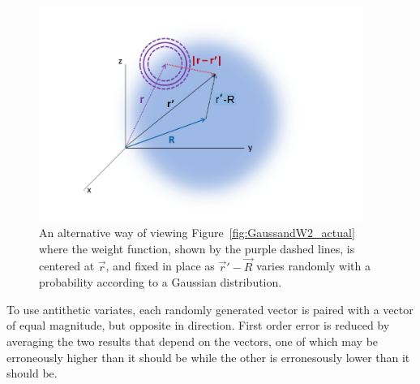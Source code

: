 \documentclass[double,12pt]{beavtex}
\begin{document}
 \begin{figure}[h!]
    \centering
    \includegraphics[height=7cm]{figs/weightandGauss2.pdf}
    \caption{An alternative way of viewing Figure~\ref{fig:GaussandW2_actual} where 
    the weight function, shown by the purple dashed lines, is centered at $\vec{r}$,  
    and fixed in place as $\vec r' - \vec R$
    varies randomly with a probability according to a Gaussian distribution.} 
  \label{fig:GaussandW2_thinkas}
  \end{figure} 
%
%
To use antithetic variates,
each randomly generated  vector is paired with a 
vector of equal magnitude, but opposite in direction. 
First order error is reduced
by averaging the two results that depend on the vectors, one of 
which may be erroneously higher than it should be while the other is 
erronesously lower than it should be.
\end{document}
